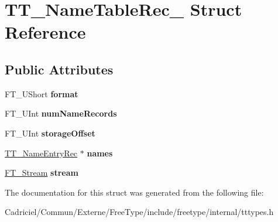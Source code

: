 \hypertarget{struct_t_t___name_table_rec__}{}\section{T\+T\+\_\+\+Name\+Table\+Rec\+\_\+ Struct Reference}
\label{struct_t_t___name_table_rec__}
\subsection*{Public Attributes}
\begin{DoxyCompactItemize}
\item 
F\+T\+\_\+\+U\+Short {\bfseries format}\hypertarget{struct_t_t___name_table_rec___a762c5431cbe285cb7153bb5650710fb0}{}\label{struct_t_t___name_table_rec___a762c5431cbe285cb7153bb5650710fb0}

\item 
F\+T\+\_\+\+U\+Int {\bfseries num\+Name\+Records}\hypertarget{struct_t_t___name_table_rec___a5b565d940b9d02bb69cd19da5cda61b8}{}\label{struct_t_t___name_table_rec___a5b565d940b9d02bb69cd19da5cda61b8}

\item 
F\+T\+\_\+\+U\+Int {\bfseries storage\+Offset}\hypertarget{struct_t_t___name_table_rec___a4ed1f4e78e39b2e206411e9ea4d23801}{}\label{struct_t_t___name_table_rec___a4ed1f4e78e39b2e206411e9ea4d23801}

\item 
\hyperlink{struct_t_t___name_entry_rec__}{T\+T\+\_\+\+Name\+Entry\+Rec} $\ast$ {\bfseries names}\hypertarget{struct_t_t___name_table_rec___a693aed17954386eb8fb5fd7f69d5b551}{}\label{struct_t_t___name_table_rec___a693aed17954386eb8fb5fd7f69d5b551}

\item 
\hyperlink{struct_f_t___stream_rec__}{F\+T\+\_\+\+Stream} {\bfseries stream}\hypertarget{struct_t_t___name_table_rec___a97109aec8cd7ca13f6627f3fee15d48d}{}\label{struct_t_t___name_table_rec___a97109aec8cd7ca13f6627f3fee15d48d}

\end{DoxyCompactItemize}


The documentation for this struct was generated from the following file\+:\begin{DoxyCompactItemize}
\item 
Cadriciel/\+Commun/\+Externe/\+Free\+Type/include/freetype/internal/tttypes.\+h\end{DoxyCompactItemize}
